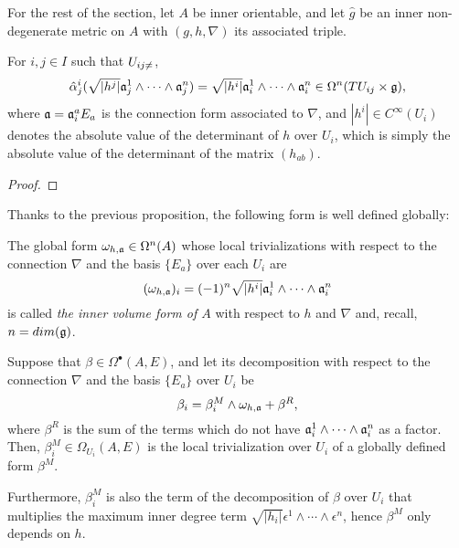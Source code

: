 For the rest of the section, let $A$ be inner orientable, and let $\hat g$ be an inner non-degenerate metric on $A$ with $(g, h, \nabla)$ its associated triple.

\begin{proposition}\label{propositionInnerVolumeFormIntegrationFOrmGloballyDefinedWell}
For $i, j \in I$ such that $U_{ij \neq \empty}$,
\begin{equation*}
    \hat \alpha^i_j(\sqrt{|h^j|} \mathfrak{a}_j^1 \wedge \cdots \wedge \mathfrak{a}_j^n) = \sqrt{|h^i|} \mathfrak{a}_i^1 \wedge \cdots \wedge \mathfrak{a}_i^n \in \Omega^n(TU_{ij} \times \mathfrak{g}),
\end{equation*}
where $\mathfrak{a} = \mathfrak{a}_i^a E_a$ is the connection form associated to $\nabla$, and $|h^i| \in C^\infty(U_i)$ denotes the absolute value of the determinant of $h$ over $U_i$, which is simply the absolute value of the determinant of the matrix $(h_{ab})$.
\end{proposition}
\begin{proof}
\todo{}
\end{proof}

Thanks to the previous proposition, the following form is well defined globally:
\begin{definition}
The global form $\omega_{h, \mathfrak{a}} \in \Omega^n(A)$ whose local trivializations with respect to the connection $\nabla$ and the basis $\{E_a\}$ over each $U_i$ are
\begin{equation*}
    (\omega_{h, \mathfrak{a}})_i = (-1)^n \sqrt{|h^i|} \mathfrak{a}_i^1 \wedge \cdots \wedge \mathfrak{a}_i^n
\end{equation*}
is called \emph{the inner volume form of $A$} with respect to $h$ and $\nabla$ and, recall, $n = dim(\mathfrak{g})$.
\end{definition}

\begin{theorem}\label{theoremIntegratedFormFactorInnerVolumeFOrmWellGloballyDefined}
Suppose that $\beta \in \Omega^\bullet(A, E)$, and let its decomposition with respect to the connection $\nabla$ and the basis $\{E_a\}$ over $U_i$ be
\begin{equation*}
    \beta_i = \beta^{M}_i \wedge \omega_{h, \alg a}%
    + \beta^R,
\end{equation*}
where $\beta^R$ is the sum of the terms which do not have $\mathfrak{a}_i^1 \wedge \cdots \wedge \mathfrak{a}_i^n$ as a factor. Then, $\beta_i^M \in \Omega_{U_i}(A, E)$ is the local trivialization over $U_i$ of a globally defined form $\beta^M$.

Furthermore, $\beta_i^M$ is also the term of the decomposition of $\beta$ over $U_i$ that multiplies the maximum inner degree term $\sqrt{|h_i|} \epsilon^1 \wedge \cdots \wedge \epsilon^n$, hence $\beta^M$ only depends on $h$.
\end{theorem}


